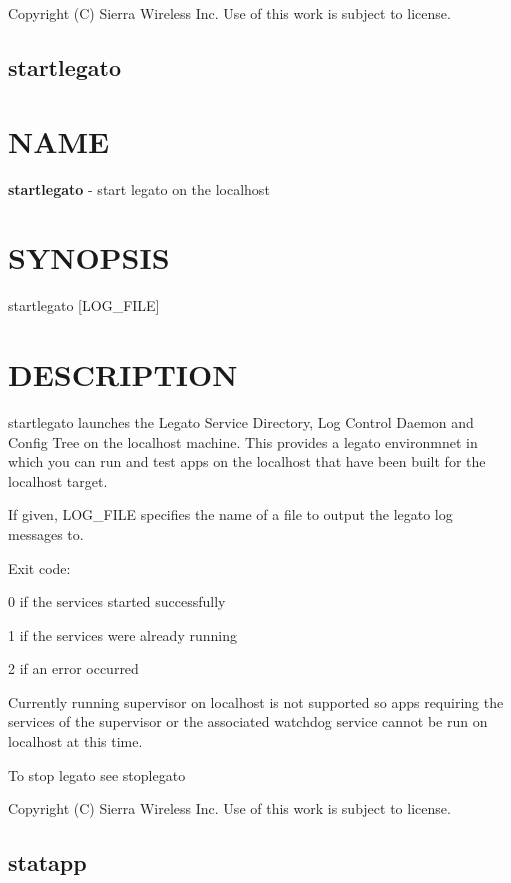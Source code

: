  Copyright (C) Sierra Wireless Inc. Use of this work is subject to license. \hypertarget{toolsHost_startlegato}{}\subsection{startlegato}\label{toolsHost_startlegato}
\section*{N\+A\+M\+E}

{\bfseries startlegato} -\/ start legato on the localhost

\section*{S\+Y\+N\+O\+P\+S\+I\+S}

{\ttfamily startlegato \mbox{[}L\+O\+G\+\_\+\+F\+I\+L\+E\mbox{]}}~\newline


\section*{D\+E\+S\+C\+R\+I\+P\+T\+I\+O\+N}

startlegato launches the Legato Service Directory, Log Control Daemon and Config Tree on the localhost machine. This provides a legato environmnet in which you can run and test apps on the localhost that have been built for the localhost target.

If given, L\+O\+G\+\_\+\+F\+I\+L\+E specifies the name of a file to output the legato log messages to.

Exit code\+:
\begin{DoxyItemize}
\item 0 if the services started successfully
\item 1 if the services were already running
\item 2 if an error occurred
\end{DoxyItemize}

Currently running supervisor on localhost is not supported so apps requiring the services of the supervisor or the associated watchdog service cannot be run on localhost at this time.

To stop legato see stoplegato



 Copyright (C) Sierra Wireless Inc. Use of this work is subject to license. \hypertarget{toolsHost_statapp}{}\subsection{statapp}\label{toolsHost_statapp}
